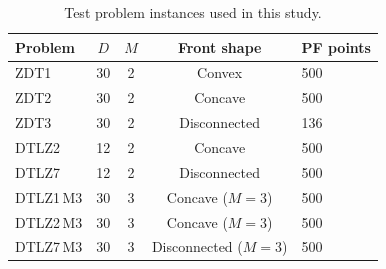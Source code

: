 \begin{table}[t]
\centering
\caption{Test problem instances used in this study.}
\label{tab:datasets}
\begin{tabular}{lcccl}
\toprule
Problem & $D$ & $M$ & Front shape & PF points \\
\midrule
ZDT1 & 30 & 2 & Convex & 500 \\
ZDT2 & 30 & 2 & Concave & 500 \\
ZDT3 & 30 & 2 & Disconnected & 136 \\
DTLZ2 & 12 & 2 & Concave & 500 \\
DTLZ7 & 12 & 2 & Disconnected & 500 \\
DTLZ1\,M3 & 30 & 3 & Concave ($M{=}3$) & 500 \\
DTLZ2\,M3 & 30 & 3 & Concave ($M{=}3$) & 500 \\
DTLZ7\,M3 & 30 & 3 & Disconnected ($M{=}3$) & 500 \\
\bottomrule
\end{tabular}
\end{table}
